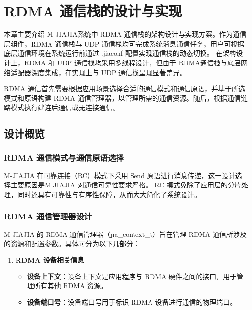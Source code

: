 \chapter{RDMA 通信栈的设计与实现}\label{chap:RDMA}{
    本章主要介绍 M-JIAJIA系统中 RDMA 通信栈的架构设计与实现方案。作为通信层组件，RDMA 通信栈与 UDP 通信栈均可完成系统消息通信任务，用户可根据底层通信环境在系统运行前通过 .jiaconf 配置实现通信栈的动态切换。
    在架构设计上，RDMA 和 UDP 通信栈均采用多线程设计，但由于 RDMA通信栈与底层网络适配器深度集成，在实现上与 UDP 通信栈呈现显著差异。

    RDMA 通信首先需要根据应用场景选择合适的通信模式和通信原语，并基于所选模式和原语构建 RDMA 通信管理器，以管理所需的通信资源。随后，根据通信链路模式执行建连后通信或无连接通信。

    \section{设计概览}\label{sec:RDMA设计概览}

    \subsection{RDMA 通信模式与通信原语选择}

    M-JIAJIA 在可靠连接（RC）模式下采用 Send 原语进行消息传递，这一设计选择主要原因是M-JIAJIA 对通信可靠性要求严格。
    RC 模式免除了应用层的分片处理，同时还具有可靠性与有序性保障，从而大大简化了系统设计。

    \subsection{RDMA 通信管理器设计}

    M-JIAJIA 的 RDMA 通信管理器（jia\_context\_t）旨在管理 RDMA 通信所涉及的资源和配置参数。具体可分为以下几部分：

    \begin{enumerate}[label=\arabic*., leftmargin=1em, align=left]
        \item \textbf{RDMA 设备相关信息}
              \begin{itemize}
                  \item \textbf{设备上下文}：设备上下文是应用程序与 RDMA 硬件之间的接口，用于管理所有其他 RDMA 资源。
                  \item \textbf{设备端口号}：设备端口号用于标识 RDMA 设备进行通信的物理端口。
              \end{itemize}


\end{enumerate}}
